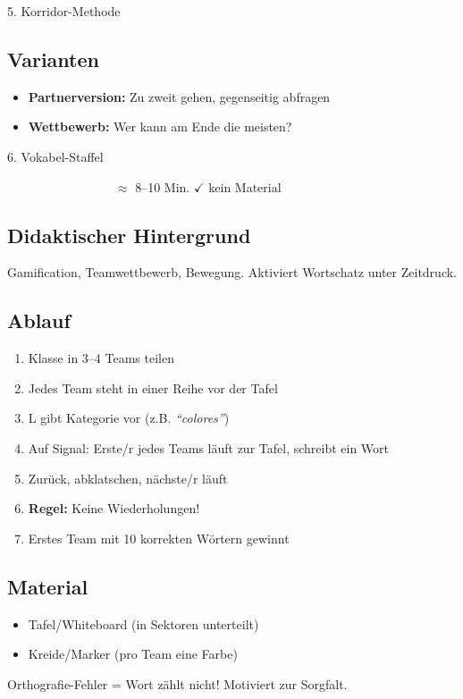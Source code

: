 \documentclass[11pt, a4paper]{article}
\newcommand{\tagWortschatz}{\colorbox{wortschatz}{\textcolor{white}{\footnotesize\textbf{WORTSCHATZ}}}}
\newcommand{\zeit}[1]{\textcolor{grau}{\footnotesize $\approx$ #1 Min.}}
\newcommand{\matKeine}{\textcolor{erfolg}{$\checkmark$ kein Material}}
\begin{document}
\begin{methode}{5. Korridor-Methode}
\subsection*{Varianten}
\begin{itemize}[leftmargin=*]
    \item \textbf{Partnerversion:} Zu zweit gehen, gegenseitig abfragen
    \item \textbf{Wettbewerb:} Wer kann am Ende die meisten?
\end{itemize}

\end{methode}

\vspace{1em}

\begin{methode}{6. Vokabel-Staffel}

\tagWortschatz{} \zeit{8--10} \hfill \matKeine

\subsection*{Didaktischer Hintergrund}
Gamification, Teamwettbewerb, Bewegung. Aktiviert Wortschatz unter Zeitdruck.

\subsection*{Ablauf}
\begin{enumerate}[leftmargin=*]
    \item Klasse in 3--4 Teams teilen
    \item Jedes Team steht in einer Reihe vor der Tafel
    \item L gibt Kategorie vor (z.B. \textit{``colores''})
    \item Auf Signal: Erste/r jedes Teams läuft zur Tafel, schreibt ein Wort
    \item Zurück, abklatschen, nächste/r läuft
    \item \textbf{Regel:} Keine Wiederholungen!
    \item Erstes Team mit 10 korrekten Wörtern gewinnt
\end{enumerate}

\subsection*{Material}
\begin{materialbox}
\begin{itemize}[label=$\square$, leftmargin=*]
    \item Tafel/Whiteboard (in Sektoren unterteilt)
    \item Kreide/Marker (pro Team eine Farbe)
\end{itemize}
\end{materialbox}

\begin{tipp}
Orthografie-Fehler = Wort zählt nicht! Motiviert zur Sorgfalt.
\end{tipp}

\end{methode}
\end{document}
